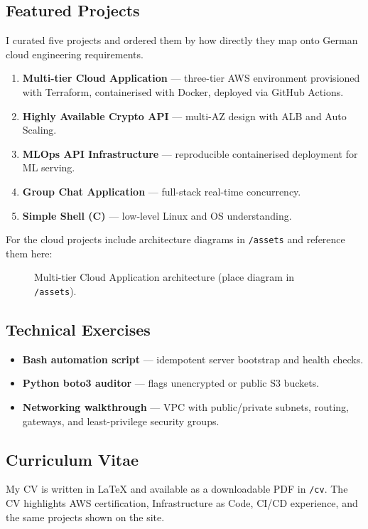 \documentclass[11pt,a4paper]{article}
\begin{document}
\subsection{Featured Projects}
I curated five projects and ordered them by how directly they map onto German cloud engineering requirements.

\begin{enumerate}
  \item \textbf{Multi-tier Cloud Application} --- three-tier AWS environment provisioned with Terraform, containerised with Docker, deployed via GitHub Actions.
  \item \textbf{Highly Available Crypto API} --- multi-AZ design with ALB and Auto Scaling.
  \item \textbf{MLOps API Infrastructure} --- reproducible containerised deployment for ML serving.
  \item \textbf{Group Chat Application} --- full-stack real-time concurrency.
  \item \textbf{Simple Shell (C)} --- low-level Linux and OS understanding.
\end{enumerate}

For the cloud projects include architecture diagrams in \texttt{/assets} and reference them here:
\begin{figure}[H]
  \centering
  \caption{Multi-tier Cloud Application architecture (place diagram in \texttt{/assets}).}
\end{figure}

\subsection{Technical Exercises}
\begin{itemize}[leftmargin=*]
  \item \textbf{Bash automation script} --- idempotent server bootstrap and health checks.
  \item \textbf{Python boto3 auditor} --- flags unencrypted or public S3 buckets.
  \item \textbf{Networking walkthrough} --- VPC with public/private subnets, routing, gateways, and least-privilege security groups.
\end{itemize}

\subsection{Curriculum Vitae}
My CV is written in LaTeX and available as a downloadable PDF in \texttt{/cv}. The CV highlights AWS certification, Infrastructure as Code, CI/CD experience, and the same projects shown on the site.
\end{document}
